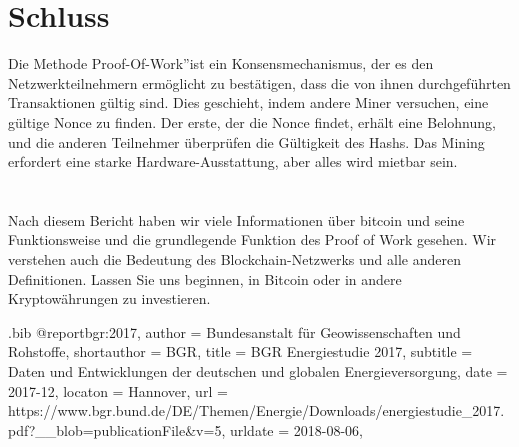 \documentclass[ngerman]{scrreprt}
\begin{document}
\chapter{Schluss}
Die Methode \textquestiondown Proof-Of-Work\textquotedblright ist ein Konsensmechanismus, der es den Netzwerkteilnehmern ermöglicht zu bestätigen, dass die von ihnen durchgeführten Transaktionen gültig sind. Dies geschieht, indem andere Miner versuchen, eine gültige Nonce zu finden. Der erste, der die Nonce findet, erhält eine Belohnung, und die anderen Teilnehmer überprüfen die Gültigkeit des Hashs. Das Mining erfordert eine starke Hardware-Ausstattung, aber alles wird mietbar sein.\\ \\ \\

Nach diesem Bericht haben wir viele Informationen über bitcoin und seine Funktionsweise und die grundlegende Funktion des Proof of Work gesehen. Wir verstehen auch die Bedeutung des Blockchain-Netzwerks und alle anderen Definitionen. Lassen Sie uns beginnen, in Bitcoin oder in andere Kryptowährungen zu investieren.\\


\begin{filecontents}{\jobname.bib}
	@report{bgr:2017,
		author      = {{Bundesanstalt für Geowissenschaften und Rohstoffe}},
		shortauthor = {BGR},
		title       = {BGR Energiestudie 2017},
		subtitle    = {Daten und Entwicklungen der deutschen und globalen Energieversorgung},
		date        = {2017-12},
		locaton     = {Hannover},
		url         = {https://www.bgr.bund.de/DE/Themen/Energie/Downloads/energiestudie_2017.pdf?__blob=publicationFile&v=5},
		urldate     = {2018-08-06},
	}
\end{filecontents}
\end{document}
